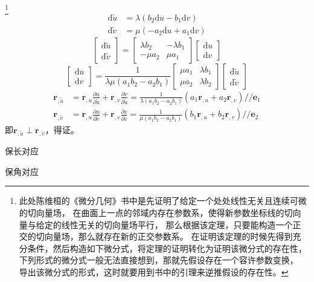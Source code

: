 \footnote{此处陈维桓的《微分几何》书中是先证明了给定一个处处线性无关且连续可微的切向量场，
在曲面上一点的邻域内存在参数系，使得新参数坐标线的切向量与给定的线性无关的切向量场平行，
那么根据该定理，只要能构造一个正交的切向量场，那么就存在新的正交参数系。
在证明该定理的时候先得到充分条件，然后构造如下微分式，将定理的证明转化为证明该微分式的存在性，
下列形式的微分式一般无法直接想到，那就先假设存在一个容许参数变换，
导出该微分式的形式，这时就要用到书中的引理来逆推假设的存在性。}
\begin{equation*}
    \begin{aligned}
    \mathrm{d}\tilde{u} &=\lambda\left(b_{2}\mathrm{d}u-b_{1}\mathrm{d}v\right)\\
    \mathrm{d}\tilde{v} &=\mu\left(-a_{2}\mathrm{d}u+a_{1}\mathrm{d}v\right)
    \end{aligned}
\end{equation*}
\begin{equation*}
    \left[\begin{array}{c}
        \mathrm{d}\tilde{u} \\ \mathrm{d}\tilde{v}
    \end{array}\right] = \left[\begin{array}{cc}
        \lambda b_{2} & -\lambda b_{1} \\ -\mu a_{2} & \mu a_{1}
    \end{array}\right]\left[\begin{array}{c}
        \mathrm{d}u \\ \mathrm{d}v
    \end{array}\right]
\end{equation*}
\begin{equation*}
    \left[\begin{array}{c}
        \mathrm{d}u \\ \mathrm{d}v
    \end{array}\right] = \frac{1}{\lambda\mu\left(a_{1}b_{2}-a_{2}b_{1}\right)}\left[\begin{array}{cc}
        \mu a_{1} & \lambda b_{1} \\ \mu a_{2} & \lambda b_{2}
    \end{array}\right]\left[\begin{array}{c}
        \mathrm{d}\tilde{u} \\ \mathrm{d}\tilde{v}
    \end{array}\right]
\end{equation*}
\begin{equation*}
    \begin{aligned}
        \mathbf{r}_{,\tilde{u}} &= \mathbf{r}_{,u}\frac{\partial u}{\partial\tilde{u}} + \mathbf{r}_{,v}\frac{\partial v}{\partial\tilde{u}}
        =\frac{1}{\lambda\left(a_{1}b_{2}-a_{2}b_{1}\right)}\left(a_{1}\mathbf{r}_{,u}+a_{2}\mathbf{r}_{,v}\right) // \mathbf{e}_{1} \\
        \mathbf{r}_{,\tilde{v}} &= \mathbf{r}_{,u}\frac{\partial u}{\partial\tilde{v}} + \mathbf{r}_{,v}\frac{\partial v}{\partial\tilde{v}}
        =\frac{1}{\mu\left(a_{1}b_{2}-a_{2}b_{1}\right)}\left(b_{1}\mathbf{r}_{,u}+b_{2}\mathbf{r}_{,v}\right) // \mathbf{e}_{2}
    \end{aligned}
\end{equation*}
即$\mathbf{r}_{,\tilde{u}} \perp \mathbf{r}_{,\tilde{v}}$，得证。

保长对应

保角对应
